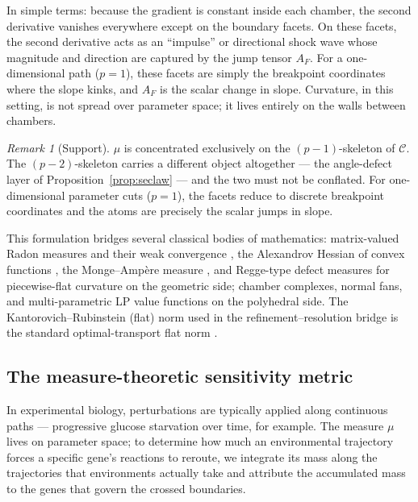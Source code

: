\documentclass[11pt,a4paper]{article}
\theoremstyle{plain}
\theoremstyle{definition}
\theoremstyle{remark}
\newtheorem{remark}[theorem]{Remark}
\newcommand{\CC}{\mathcal{C}}
\begin{document}
In simple terms: because the gradient is constant inside each
chamber, the second derivative vanishes everywhere except on the
boundary facets. On these facets, the second derivative acts as an
``impulse'' or directional shock wave whose magnitude and direction
are captured by the jump tensor $A_F$. For a one-dimensional path
($p=1$), these facets are simply the breakpoint coordinates where the
slope kinks, and $A_F$ is the scalar change in slope. Curvature, in
this setting, is not spread over parameter space; it lives entirely on
the walls between chambers.

\begin{remark}[Support]\label{rem:support}
$\mu$ is concentrated exclusively on the $(p-1)$-skeleton of $\CC$.
The $(p-2)$-skeleton carries a different object altogether --- the
angle-defect layer of Proposition~\ref{prop:seclaw} --- and the two
must not be conflated. For one-dimensional parameter cuts ($p=1$),
the facets reduce to discrete breakpoint coordinates and the atoms
are precisely the scalar jumps in slope.
\end{remark}

This formulation bridges several classical bodies of mathematics:
matrix-valued Radon measures and their weak convergence
\citep{billingsley1999}, the Alexandrov Hessian of convex functions
\citep{alexandrov1939}, the Monge--Amp\`ere measure \citep{gutierrez2001},
and Regge-type defect measures for piecewise-flat curvature
\citep{regge1961, cheeger1984} on the geometric side; chamber
complexes, normal fans, and multi-parametric LP value functions
\citep{rockafellar1970, ziegler1995, borrelli2003} on the polyhedral
side. The Kantorovich--Rubinstein (flat) norm used in the
refinement--resolution bridge is the standard optimal-transport flat
norm \citep{villani2009}.

\subsection{The measure-theoretic sensitivity metric}

In experimental biology, perturbations are typically applied along
continuous paths --- progressive glucose starvation over time, for
example. The measure $\mu$ lives on parameter space; to determine how
much an environmental trajectory forces a specific gene's reactions to
reroute, we integrate its mass along the trajectories that
environments actually take and attribute the accumulated mass to the
genes that govern the crossed boundaries.
\end{document}

